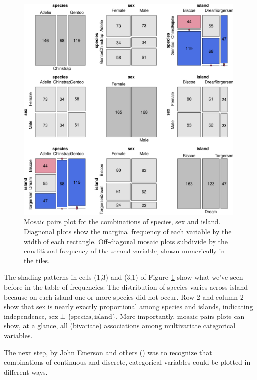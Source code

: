 \documentclass[
  letterpaper,
  10pt,
  krantz2]{krantz}
\begin{document}
{\begin{figure}[H]
{\includegraphics[width=1\textwidth,height=\textheight]{figs/ch03/fig-peng-mosaic-1.pdf}

}

\caption{\label{fig-peng-mosaic}Mosaic pairs plot for the combinations
of species, sex and island. Diagnonal plots show the marginal frequency
of each variable by the width of each rectangle. Off-diagonal mosaic
plots subdivide by the conditional frequency of the second variable,
shown numerically in the tiles.}

\end{figure}%

The shading patterns in cells (1,3) and (3,1) of
Figure~\ref{fig-peng-mosaic} show what we've seen before in the table of
frequencies: The distribution of species varies across island because on
each island one or more species did not occur. Row 2 and column 2 show
that sex is nearly exactly proportional among species and islands,
indicating independence,
\(\text{sex} \perp \{\text{species}, \text{island}\}\). More
importantly, mosaic pairs plots can show, at a glance, all (bivariate)
associations among multivariate categorical variables.

The next step, by John Emerson and others
() was to
recognize that combinations of continuous and discrete, categorical
variables could be plotted in different ways.

}
\end{document}
